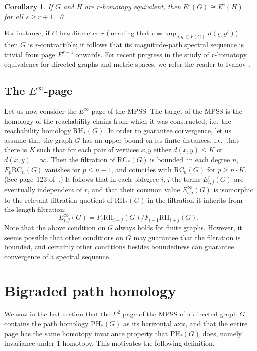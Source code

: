 \documentclass[a4paper, 11 pt, oneside, reqno]{amsart}
\numberwithin{lemma}{section}
\newtheorem{corollary}[lemma]{Corollary}
\theoremstyle{definition}
\newcommand{\RC}{\mathrm{RC}}
\newcommand{\RH}{\mathrm{RH}}
\newcommand{\PH}{\mathrm{PH}}
\begin{document}
\begin{corollary}
    If \(G\) and \(H\) are \(r\)-homotopy equivalent, then \(E^s(G) \cong E^s(H)\) for all \(s \geq r + 1\). \qed
\end{corollary}

For instance, if \(G\) has diameter \(r\) (meaning that \(r = \sup_{g,g' \in V(G)} d(g,g')\))
then \(G\) is \(r\)-contractible; it follows that its magnitude-path spectral sequence is trivial from page \(E^{r+1}\) onwards. For recent progress in the study of \(r\)-homotopy equivalence for directed graphs and metric spaces, we refer the reader to Ivanov \cite{SOIvanov}.

\subsection{The $E^\infty$-page}
Let us now consider the $E^\infty$-page of the MPSS.
The target of the MPSS is the homology of the reachability
chains from which it was constructed,
i.e.~the reachability homology $\RH_\ast(G)$.
In order to guarantee convergence,
let us assume that the graph $G$ has an
upper bound on its finite distances,
i.e.~that there is $K$ such that for each pair of vertices $x,y$
either $d(x,y)\leq K$ or $d(x,y)=\infty$.
Then the filtration of $\RC_\ast(G)$ is bounded:
in each degree $n$, $F_p\RC_n(G)$ vanishes for $p\leq n-1$,
and coincides with $\RC_n(G)$ for $p\geq n\cdot K$.
(See page~123 of~\cite{Weibel}.)
It follows that  in each bidegree $i,j$ 
the terms $E^r_{i,j}(G)$ are eventually independent of $r$,
and that their common value $E^\infty_{i,j}(G)$ is isomorphic
to the relevant filtration quotient of $\RH_\ast(G)$
in the filtration it inherits from the length filtration:
\[
    E^\infty_{i,j}(G)
    =
    F_i\RH_{i+j}(G)/F_{i-1}\RH_{i+j}(G).
\] 
Note that the above condition on $G$ always holds for
finite graphs.
However, it seems possible that 
other conditions on $G$ may guarantee that the filtration
is bounded, and certainly other conditions besides boundedness can
guarantee convergence of a spectral sequence.


\section{Bigraded path homology}\label{sec:BPH}

We saw in the last section that the $E^2$-page of the MPSS
of a directed graph $G$ contains the path homology $\PH_\ast(G)$
as its horizontal axis, and that the entire page has the same 
homotopy invariance property that $\PH_\ast(G)$ does,
namely invariance under $1$-homotopy.
This motivates the following definition.
\end{document}
